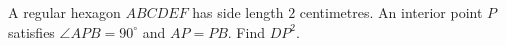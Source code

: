 A regular hexagon $ABCDEF$ has side length $2$ centimetres. An interior point $P$ satisfies $\angle APB=90^\circ$ and $AP=PB$. Find $DP^2$.
